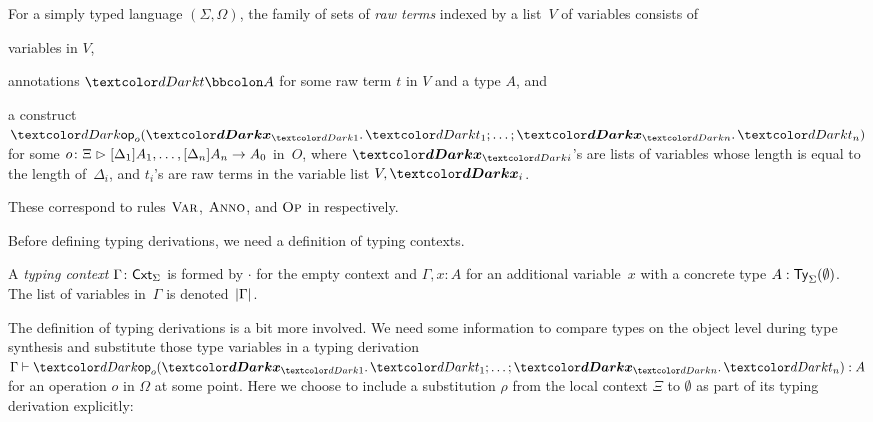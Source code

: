 \begin{definition}
  For a simply typed language $(\Sigma, \Omega)$, the family of sets of \emph{raw terms} indexed by a list~$V$ of variables consists of
  \begin{inlineenum}
    \item variables in $V$,
    \item annotations $\isTerm{t \annotate A}$ for some raw term $t$ in $V$ and a type $A$, and
    \item a construct $\tmOpts$ for some $o\colon \Xi \mathrel{\rhd} [\Delta_{1}]A_{1}, \ldots, [\Delta_{n}]A_{n} \to A_0$ in~$O$, where $\vars{x}_{\isTerm{i}}$'s are lists of variables whose length is equal to the length of~$\Delta_i$, and $t_i$'s are raw terms in the variable list $V, \vars{x}_i$.
  \end{inlineenum}
  These correspond to rules $\textnormal{\textsc{Var}}$, $\textnormal{\textsc{Anno}}$, and $\textnormal{\textsc{Op}}$ in  respectively.
\end{definition}

Before defining typing derivations, we need a definition of typing contexts.

\begin{definition}
A \emph{typing context} $\Gamma \colon \mathsf{Cxt}_{\Sigma}$ is formed by $\cdot$ for the empty context and $\Gamma, x : A$ for an additional variable~$x$ with a concrete type $A : \mathsf{Ty}_{\Sigma}(\emptyset)$.
The list of variables in~$\Gamma$ is denoted~$\left|\Gamma\right|$.
\end{definition}

The definition of typing derivations is a bit more involved.
We need some information to compare types on the object level during type synthesis and substitute those type variables in a typing derivation $\Gamma \vdash \tmOpts : A$ for an operation $o$ in $\Omega$ at some point.
Here we choose to include a substitution $\rho$ from the local context $\Xi$ to $\emptyset$ as part of its typing derivation explicitly:

